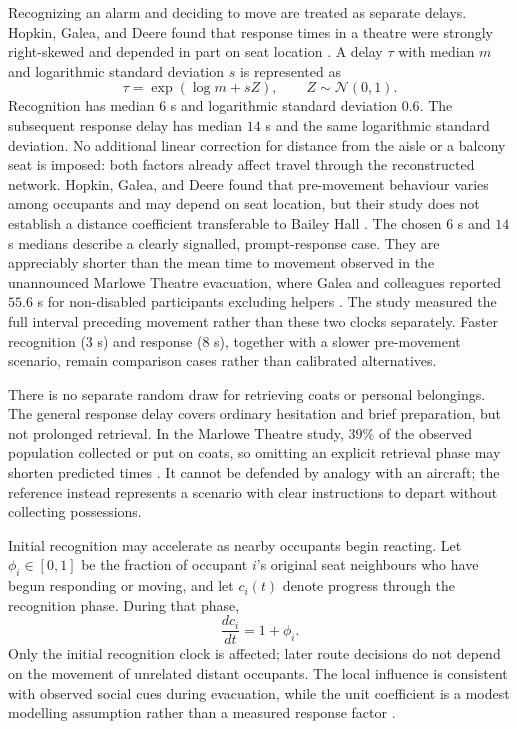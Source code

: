 \documentclass[11pt,a4paper]{article}
\begin{document}
Recognizing an alarm and deciding to move are treated as separate delays. Hopkin, Galea, and Deere found that response times in a theatre were strongly right-skewed and depended in part on seat location \cite{hopkin}. A delay $\tau$ with median $m$ and logarithmic standard deviation $s$ is represented as
\begin{equation}\label{eq:lognormal-time}
\tau=\exp(\log m+sZ),\qquad Z\sim\mathcal N(0,1).
\end{equation}
Recognition has median $6$ s and logarithmic standard deviation $0.6$. The subsequent response delay has median $14$ s and the same logarithmic standard deviation. No additional linear correction for distance from the aisle or a balcony seat is imposed: both factors already affect travel through the reconstructed network. Hopkin, Galea, and Deere found that pre-movement behaviour varies among occupants and may depend on seat location, but their study does not establish a distance coefficient transferable to Bailey Hall \cite{hopkin}. The chosen $6$ s and $14$ s medians describe a clearly signalled, prompt-response case. They are appreciably shorter than the mean time to movement observed in the unannounced Marlowe Theatre evacuation, where Galea and colleagues reported $55.6$ s for non-disabled participants excluding helpers \cite{galea2017theatre}. The study measured the full interval preceding movement rather than these two clocks separately. Faster recognition ($3$ s) and response ($8$ s), together with a slower pre-movement scenario, remain comparison cases rather than calibrated alternatives.

There is no separate random draw for retrieving coats or personal belongings. The general response delay covers ordinary hesitation and brief preparation, but not prolonged retrieval. In the Marlowe Theatre study, $39\%$ of the observed population collected or put on coats, so omitting an explicit retrieval phase may shorten predicted times \cite{galea2017theatre}. It cannot be defended by analogy with an aircraft; the reference instead represents a scenario with clear instructions to depart without collecting possessions.

Initial recognition may accelerate as nearby occupants begin reacting. Let $\phi_i\in[0,1]$ be the fraction of occupant $i$'s original seat neighbours who have begun responding or moving, and let $c_i(t)$ denote progress through the recognition phase. During that phase,
\begin{equation}\label{eq:social}
\frac{dc_i}{dt}=1+\phi_i.
\end{equation}
Only the initial recognition clock is affected; later route decisions do not depend on the movement of unrelated distant occupants. The local influence is consistent with observed social cues during evacuation, while the unit coefficient is a modest modelling assumption rather than a measured response factor \cite{bode,fu2023}.
\end{document}
